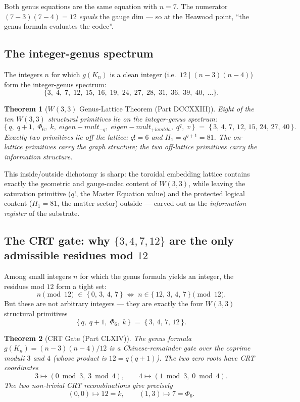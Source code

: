 \documentclass[11pt]{article}
\def\textbf#1{#1}%
\def\text#1{#1}%
\def\lambda{lambda}%
\def\Phi#1{Phi#1}%
\newtheorem*{theorem}{Theorem}
\begin{document}
Both genus equations are the same equation with $n = 7$. The numerator $(7-3)(7-4) = 12$ \emph{equals} the gauge dim --- so at the Heawood point, ``the genus formula evaluates the codec''.

\subsection*{The integer-genus spectrum}

The integers $n$ for which $g(K_n)$ is a clean integer (i.e.\ $12 \mid (n-3)(n-4)$) form the \textbf{integer-genus spectrum}:
\[
\{3,\; 4,\; 7,\; 12,\; 15,\; 16,\; 19,\; 24,\; 27,\; 28,\; 31,\; 36,\; 39,\; 40,\; \ldots\}.
\]

\begin{theorem}[$W(3,3)$ Genus-Lattice Theorem (Part DCCXXIII)]
Eight of the ten $W(3,3)$ structural primitives lie on the integer-genus spectrum:
\[
\{\,q,\; q+1,\; \Phi_6,\; k,\; \text{eigen-mult}_{-q},\; \text{eigen-mult}_{+\lambda},\; q^q,\; v\,\}
\;=\; \{\,3,\,4,\,7,\,12,\,15,\,24,\,27,\,40\,\}.
\]
Exactly two primitives lie \emph{off} the lattice: $q! = 6$ and $H_1 = q^{q+1} = 81$. The on-lattice primitives carry the \emph{graph} structure; the two off-lattice primitives carry the \emph{information} structure.
\end{theorem}

This inside/outside dichotomy is sharp: the toroidal embedding lattice contains exactly the geometric and gauge-codec content of $W(3,3)$, while leaving the saturation primitive ($q!$, the Master Equation value) and the protected logical content ($H_1 = 81$, the matter sector) outside --- carved out as the \emph{information register} of the substrate.

\subsection*{The CRT gate: why $\{3,4,7,12\}$ are the only admissible residues mod $12$}

\label{sec:crt-gate}

Among small integers $n$ for which the genus formula yields an integer, the residues mod $12$ form a tight set:
\[
n \pmod{12} \;\in\; \{\,0,\,3,\,4,\,7\,\} \;\Longleftrightarrow\; n \in \{\,12,\,3,\,4,\,7\,\} \pmod{12}.
\]
But these are not arbitrary integers --- they are exactly the four $W(3,3)$ structural primitives
\[
\{\,q,\;q+1,\;\Phi_6,\;k\,\} \;=\; \{\,3,\,4,\,7,\,12\,\}.
\]

\begin{theorem}[CRT Gate (Part CLXIV)]
The genus formula $g(K_n) = (n-3)(n-4)/12$ is a \textbf{Chinese-remainder gate} over the coprime moduli $3$ and $4$ (whose product is $12 = q(q+1)$). The two zero roots have CRT coordinates
\[
3 \mapsto (0 \bmod 3,\; 3 \bmod 4), \qquad
4 \mapsto (1 \bmod 3,\; 0 \bmod 4).
\]
The two non-trivial CRT recombinations give precisely
\[
(0,0) \mapsto 12 = k, \qquad
(1,3) \mapsto 7 = \Phi_6.
\]
\end{theorem}
\end{document}
